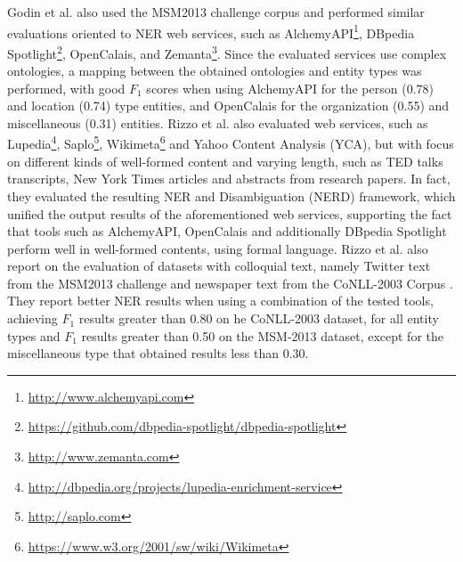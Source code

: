 Godin et al. \citep{godin2013leveraging} also used the MSM2013 challenge corpus and performed similar evaluations oriented to NER web services, such as AlchemyAPI\footnote{\url{http://www.alchemyapi.com}}, DBpedia Spotlight\footnote{\url{https://github.com/dbpedia-spotlight/dbpedia-spotlight}}, OpenCalais, and Zemanta\footnote{\url{http://www.zemanta.com}}. Since the evaluated services use complex ontologies, a mapping between the obtained ontologies and entity types was performed, with good $F_1$ scores when using AlchemyAPI for the person (0.78) and location (0.74) type entities, and OpenCalais for the organization (0.55) and miscellaneous (0.31) entities.
Rizzo et al. \citep{rizzo2012nerd} also evaluated web services, such as Lupedia\footnote{\url{http://dbpedia.org/projects/lupedia-enrichment-service}}, Saplo\footnote{\url{http://saplo.com}}, Wikimeta\footnote{\url{https://www.w3.org/2001/sw/wiki/Wikimeta}} and Yahoo Content Analysis (YCA), but with focus on different kinds of well-formed content and varying length, such as TED talks transcripts, New York Times articles and abstracts from research papers. In fact, they evaluated the resulting NER and Disambiguation (NERD) framework, which unified the output results of the aforementioned web services, supporting the fact that tools such as AlchemyAPI, OpenCalais and additionally DBpedia Spotlight perform well in well-formed contents, using formal language. Rizzo et al. also report on the evaluation of datasets with colloquial text, namely Twitter text from the MSM2013 challenge and newspaper text from the CoNLL-2003 Corpus \citep{rizzo2014benchmarking}. They report better NER results when using a combination of the tested tools, achieving $F_1$ results greater than 0.80 on he CoNLL-2003 dataset, for all entity types and $F_1$ results greater than 0.50 on the MSM-2013 dataset, except for the miscellaneous type that obtained results less than 0.30.

